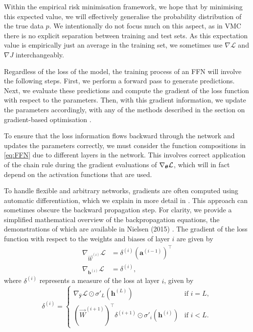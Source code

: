 Within the empirical risk minimisation framework, we hope that by minimising this expected value, we will effectively generalise the probability distribution of the true data $p$. We intentionally do not focus much on this aspect, as in VMC there is no explicit separation between training and test sets. As this expectation value is empirically just an average in the training set, we sometimes use $\nabla \mathcal{L}$ and $\nabla J$ interchangeably.

Regardless of the loss of the model, the training process of an FFN will involve the following steps. First, we perform a forward pass to generate predictions. Next, we evaluate these predictions and compute the gradient of the loss function with respect to the parameters. Then, with this gradient information, we update the parameters accordingly, with any of the methods described in the section on gradient-based optimisation .

To ensure that the loss information flows backward through the network and updates the parameters correctly, we must consider the function compositions in \eqref{eq:FFN} due to different layers in the network. This involves correct application of the chain rule during the gradient evaluations of $\nabla_{\boldsymbol{\theta}} \mathcal{L}$, which will in fact depend on the activation functions that are used.

To handle flexible and arbitrary networks, gradients are often computed using automatic differentiation, which we explain in more detail in . This approach can sometimes obscure the backward propagation step. For clarity, we provide a simplified mathematical overview of the backpropagation equations, the demonstrations of which are available in Nielsen (2015) \cite{nielsen2015neural}. The gradient of the loss function with respect to the weights and biases of layer $i$ are given by 
\begin{align}
    \nabla_{\Vec{W}^{(i)}} \mathcal{L} &= \delta^{(i)} (\mathbf{a}^{(i-1)})^\top \label{eq:nabla_weight}\\
    \nabla_{\mathbf{b}^{(i)}} \mathcal{L} &= \delta^{(i)},\label{eq:nabla_bias}
\end{align}
where $\delta^{(i)}$ represents a measure of the loss at layer $i$, given by 
\begin{equation*}
  \delta^{(i)} = \begin{cases}
    \nabla_{\mathbf{\hat{y}}} \mathcal{L} \odot \sigma'_L(\mathbf{h}^{(L)}) & \text{if } i = L, \\
    (\Vec{W}^{(i+1)})^\top \delta^{(i+1)} \odot \sigma'_i(\mathbf{h}^{(i)}) & \text{if } i < L.
  \end{cases}
\end{equation*}

